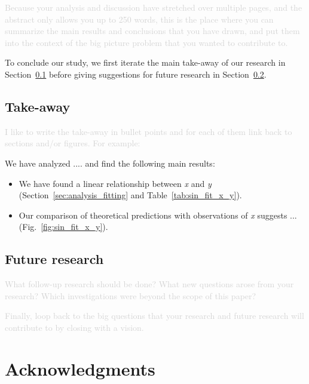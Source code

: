 \documentclass[twocolumn,apj,numberedappendix,appendixfloats]{openjournal}
\newcommand{\comment}[1]{\textcolor{lightgray}{#1}}
\begin{document}
\comment{Because your analysis and discussion have stretched over multiple pages, and the abstract only allows you up to 250 words, this is the place where you can summarize the main results and conclusions that you have drawn, and put them into the context of the big picture problem that you wanted to contribute to.}

To conclude our study, we first iterate the main take-away of our research in Section~\ref{sec:conclusions_takeaway} before giving suggestions for future research in Section~\ref{sec:conclusions_future_research}.

\subsection{Take-away} \label{sec:conclusions_takeaway}

\comment{I like to write the take-away in bullet points and for each of them link back to sections and/or figures. For example:}

We have analyzed .... and find the following main results:
\begin{itemize}
    \item We have found a linear relationship between \textit{x} and \textit{y} (Section~\ref{sec:analysis_fitting} and Table~\ref{tab:sin_fit_x_y}).
    \item Our comparison of theoretical predictions with observations of  \textit{x} suggests ... (Fig.~\ref{fig:sin_fit_x_y}).
\end{itemize}

\subsection{Future research} \label{sec:conclusions_future_research}

\comment{What follow-up research should be done? What new questions arose from your research? Which investigations were beyond the scope of this paper?}

\comment{Finally, loop back to the big questions that your research and future research will contribute to by closing with a vision.}

\clearpage

\section*{Acknowledgments}
\end{document}
